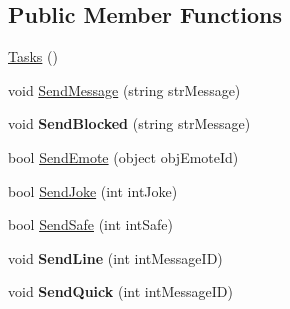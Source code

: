 \subsection*{\-Public \-Member \-Functions}
\begin{DoxyCompactItemize}
\item 
\hyperlink{classSharpenguin_1_1Tasks_ad11714a7d933773ab18d4bb2585edeee}{\-Tasks} ()
\item 
void \hyperlink{classSharpenguin_1_1Tasks_aded18ef49c423a750812df9dad65347f}{\-Send\-Message} (string str\-Message)
\item 
\hypertarget{classSharpenguin_1_1Tasks_abf3a4f9bdb323896e55c599a05f5eac8}{void {\bfseries \-Send\-Blocked} (string str\-Message)}\label{classSharpenguin_1_1Tasks_abf3a4f9bdb323896e55c599a05f5eac8}

\item 
bool \hyperlink{classSharpenguin_1_1Tasks_a2c6d78357cc26cb67b0f8af7872adb19}{\-Send\-Emote} (object obj\-Emote\-Id)
\item 
bool \hyperlink{classSharpenguin_1_1Tasks_acdb6387b11485a7e14c70dd421c76388}{\-Send\-Joke} (int int\-Joke)
\item 
bool \hyperlink{classSharpenguin_1_1Tasks_a1226e45b3561d9a0ab01575ad70a3622}{\-Send\-Safe} (int int\-Safe)
\item 
\hypertarget{classSharpenguin_1_1Tasks_a0fe79158b2c170853d3708449e9b0a3b}{void {\bfseries \-Send\-Line} (int int\-Message\-I\-D)}\label{classSharpenguin_1_1Tasks_a0fe79158b2c170853d3708449e9b0a3b}

\item 
\hypertarget{classSharpenguin_1_1Tasks_ad46067f2d4d94523038001511eb0a733}{void {\bfseries \-Send\-Quick} (int int\-Message\-I\-D)}\label{classSharpenguin_1_1Tasks_ad46067f2d4d94523038001511eb0a733}


\end{DoxyCompactItemize}
